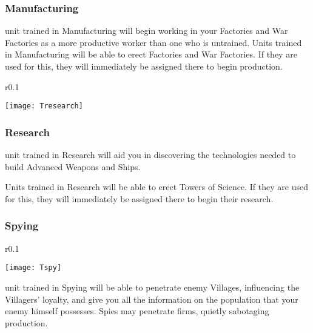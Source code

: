 \subsubsection{\textsf{Manufacturing}}


 unit trained in Manufacturing will begin working in your Factories and War Factories as a more productive worker than one who is untrained. Units trained in Manufacturing will be able to erect Factories and War Factories. If they are used for this, they will immediately be assigned there to begin production.

\begin{wrapfigure}{r}{0.1\textwidth}
        \begin{center}
        \texttt{[image: Tresearch]}
    \end{center}
    \vspace{-20pt}
\end{wrapfigure}

\subsubsection{\textsf{Research}}


 unit trained in Research will aid you in discovering the technologies needed to build Advanced Weapons and Ships.

Units trained in Research will be able to erect Towers of Science. If they are used for this, they will immediately be assigned there to begin their research.

\subsubsection{\textsf{Spying}}


\begin{wrapfigure}{r}{0.1\textwidth}
    \vspace{-20pt}
    \begin{center}
        \texttt{[image: Tspy]}
    \end{center}
    \vspace{-20pt}
\end{wrapfigure}

 unit trained in Spying will be able to penetrate enemy Villages, influencing the Villagers’ loyalty, and give you all the information on the population that your enemy himself possesses. Spies may penetrate firms, quietly sabotaging production.


